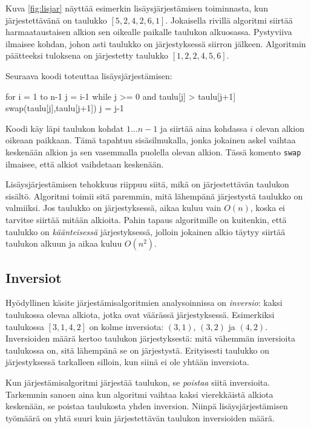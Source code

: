 Kuva \ref{fig:lisjar} näyttää esimerkin lisäysjärjestämisen
toiminnasta, kun järjes\-tettävänä on taulukko $[5,2,4,2,6,1]$.
Jokaisella rivillä algoritmi siirtää harmaataustaisen
alkion sen oikealle paikalle taulukon alkuosassa.
Pystyviiva ilmaisee kohdan, johon asti taulukko on järjestyksessä
siirron jälkeen.
Algoritmin päätteeksi tuloksena on järjestetty taulukko $[1,2,2,4,5,6]$.

Seuraava koodi toteuttaa lisäysjärjestämisen:

\begin{code}
for i = 1 to n-1
    j = i-1
    while j >= 0 and taulu[j] > taulu[j+1]
        swap(taulu[j],taulu[j+1])
        j = j-1
\end{code}

Koodi käy läpi taulukon kohdat $1 \dots n-1$
ja siirtää aina kohdassa $i$ olevan alkion
oikeaan paikkaan.
Tämä tapahtuu sisäsilmukalla,
jonka jokainen askel vaihtaa keskenään alkion
ja sen vasemmalla puolella olevan alkion.
Tässä komento \texttt{swap} ilmaisee,
että alkiot vaihdetaan keskenään.

Lisäysjärjestämisen tehokkuus riippuu siitä,
mikä on järjestettävän taulukon sisältö.
Algoritmi toimii sitä paremmin, mitä lähempänä järjestystä
taulukko on valmiiksi.
Jos taulukko on järjestyksessä,
aikaa kuluu vain $O(n)$, koska ei tarvitse siirtää
mitään alkioita.
Pahin tapaus algoritmille on kuitenkin, että taulukko on
\emph{käänteisessä} järjestyksessä,
jolloin jokainen alkio täytyy siirtää
taulukon alkuun ja aikaa kuluu $O(n^2)$.

\subsection{Inversiot}


Hyödyllinen käsite järjestämisalgoritmien analysoinnissa
on \emph{inversio}: kaksi taulukossa olevaa alkiota,
jotka ovat väärässä järjestyksessä.
Esimerkiksi taulukossa $[3,1,4,2]$ on kolme inversiota:
$(3,1)$, $(3,2)$ ja $(4,2)$.
Inversioiden määrä kertoo taulukon järjestyksestä:
mitä vähemmän inversioita taulukossa on,
sitä lähempänä se on järjestystä.
Erityisesti taulukko on järjestyksessä tarkalleen silloin,
kun siinä ei ole yhtään inversiota.

Kun järjestämisalgoritmi järjestää taulukon,
se \emph{poistaa} siitä inversioita.
Tarkemmin sanoen aina kun
algoritmi vaihtaa kaksi vierekkäistä alkiota keskenään,
se poistaa taulukosta yhden inversion.
Niinpä lisäysjärjestämisen työmäärä on yhtä suuri
kuin järjestettävän taulukon inversioiden määrä.

